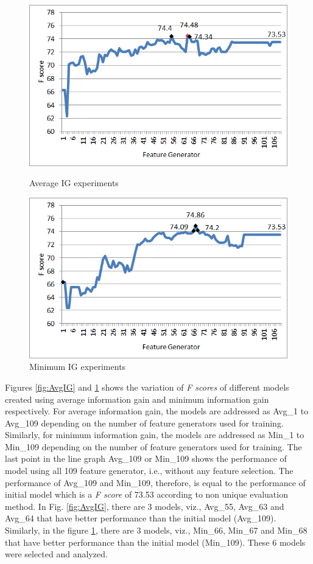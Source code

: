 \begin{figure}
\centering
\begin{minipage}{.5\textwidth}
  \centering
  \includegraphics[width=.95\textwidth]{figures/AvgIGAnalysis.png}
  \caption{Average IG experiments}
  \label{fig:AvgIG}
\end{minipage}%
\begin{minipage}{.5\textwidth}
  \centering
  \includegraphics[width=.95\textwidth]{figures/MinIGAnalysis.png}
  \caption{Minimum IG experiments}
  \label{fig:MinIG}
\end{minipage}
\end{figure} 

Figures \ref{fig:AvgIG} and \ref{fig:MinIG} shows the variation of \textit{F scores} of different models created using average information gain and minimum information gain respectively. For average information gain, the models are addressed as Avg\_1 to Avg\_109 depending on the number of feature generators used for training. Similarly, for minimum information gain, the models are addressed as Min\_1 to Min\_109 depending on the number of feature generators used for training. The last point in the line graph Avg\_109 or Min\_109 shows the performance of model using all 109 feature generator, i.e., without any feature selection. The performance of Avg\_109 and Min\_109, therefore, is equal to the performance of initial model which is a \textit{F score} of 73.53 according to non unique evaluation method. In Fig. \ref{fig:AvgIG}, there are 3 models, viz., Avg\_55, Avg\_63 and Avg\_64 that have better performance than the initial model (Avg\_109). Similarly, in the figure \ref{fig:MinIG}, there are 3 models, viz., Min\_66, Min\_67 and Min\_68 that have better performance than the initial model (Min\_109). These 6 models were selected and analyzed.

